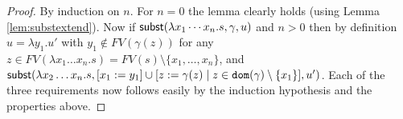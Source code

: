 \documentclass{lmcs}
\theoremstyle{theorem}\newtheorem{theorem}{Theorem}
\theoremstyle{theorem}\newtheorem{lemma}[theorem]{Lemma}
\theoremstyle{theorem}\newtheorem{corollary}[theorem]{Corollary}
\theoremstyle{definition}\newtheorem{definition}[theorem]{Definition}
\theoremstyle{definition}\newtheorem{example}[theorem]{Example}
\newcommand{\V}{\mathcal{V}}
\newcommand{\M}{\mathcal{M}}
\newcommand{\FV}{\mathit{FV}}
\newcommand{\FMV}{\mathit{MV}}
\newcommand{\domain}{\mathtt{dom}}
\newcommand{\avar}{x}
\newcommand{\bvar}{y}
\newcommand{\cvar}{z}
\newcommand{\Avar}{X}
\newcommand{\abs}[2]{\lambda #1.#2}
\begin{document}
\begin{proof}
By induction on $n$.  For $n = 0$ the lemma clearly holds (using Lemma
\ref{lem:substextend}).
Now if $\subrel{\abs{\avar_1 \cdots \avar_n}{s},\gamma,u}$ and $n > 0$ then
by definition $u = \abs{\bvar_1}{u'}$ with $\bvar_1 \notin \FV(\gamma(\cvar))$
for any $\cvar \in \FV(\abs{\avar_1 \dots \avar_n}{s}) = \FV(s) \setminus
\{\avar_1,\dots,\avar_n\}$, and $\subrel{\abs{\avar_2 \dots \avar_n}{s},
[\avar_1:=\bvar_1] \cup [\cvar:=\gamma(\cvar) \mid \cvar \in \domain(\gamma)
\setminus \{\avar_1\}],u'}$.
Each of the three requirements now follows easily by the induction hypothesis and the properties above.

\end{proof}
\end{document}
